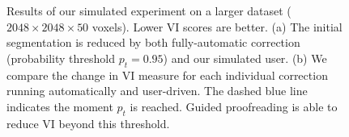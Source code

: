 
\begin{figure}[ht]
 \centering
    \hfill
	\caption{Results of our simulated experiment on a larger dataset ($2048\times2048\times50$ voxels). Lower VI scores are better. (a) The initial segmentation is reduced by both fully-automatic correction (probability threshold $p_t=0.95$) and our simulated user. (b) We compare the change in VI measure for each individual correction running automatically and user-driven. The dashed blue line indicates the moment $p_t$ is reached. Guided proofreading is able to reduce VI beyond this threshold.}
\label{fig:cylinderresults}
\end{figure}


